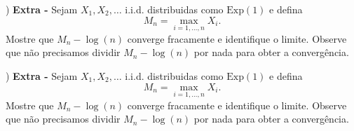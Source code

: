 \documentclass{article}
\newcommand*\1{\mathds{1}}
\begin{document}
\medskip
\medskip
\medskip

) {\bf Extra -} Sejam $X_1, X_2, \dots$ i.i.d. distribuidas como $\text{Exp}(1)$ e defina
\begin{equation}
  M_n = \max_{i = 1, \dots, n} X_i.
\end{equation}
Mostre que $M_n - \log(n)$ converge fracamente e identifique o limite.
Observe que não precisamos dividir $M_n - \log(n)$ por nada para obter a convergência.

\medskip
\medskip
\medskip

) {\bf Extra -} Sejam $X_1, X_2, \dots$ i.i.d. distribuidas como $\text{Exp}(1)$ e defina
\begin{equation}
  M_n = \max_{i = 1, \dots, n} X_i.
\end{equation}
Mostre que $M_n - \log(n)$ converge fracamente e identifique o limite.
Observe que não precisamos dividir $M_n - \log(n)$ por nada para obter a convergência.

\medskip
\medskip
\medskip
\end{document}
